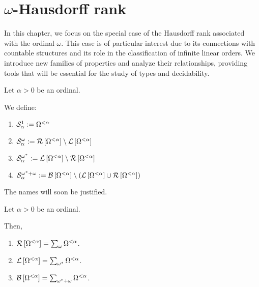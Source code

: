 \section{\texorpdfstring{$\omega$}{omega}-Hausdorff rank}

In this chapter, we focus on the special case of the Hausdorff rank associated with the ordinal $\omega$. This case is of particular interest due to its connections with countable structures and its role in the classification of infinite linear orders. We introduce new families of properties and analyze their relationships, providing tools that will be essential for the study of types and decidability.

\begin{definitions}
  Let $\alpha > 0$ be an ordinal.

  We define:
  \begin{enumerate}
    \item $\mathcal{S}^{1}_{\alpha} := \Omega^{< \alpha}$
    \item $\mathcal{S}^{\omega}_{\alpha} := \mathcal{R} \left[ {{\Omega^{< \alpha}}} \right] \setminus \mathcal{L} \left[ {{\Omega^{< \alpha}}} \right]$
    \item $\mathcal{S}^{\omega^\ast}_{\alpha} := \mathcal{L} \left[ {{\Omega^{< \alpha}}} \right] \setminus \mathcal{R} \left[ {{\Omega^{< \alpha}}} \right]$
    \item $\mathcal{S}^{\omega^\ast + \omega}_{\alpha} := \mathcal{B} \left[ {{\Omega^{< \alpha}}} \right] \setminus \left( { \mathcal{L} \left[ {{\Omega^{< \alpha}}} \right] \cup \mathcal{R} \left[ {{\Omega^{< \alpha}}} \right] } \right)$
  \end{enumerate}

  The names will soon be justified.
\end{definitions}

\begin{lemma}\label{bounded-structure}
  Let $\alpha > 0$ be an ordinal.

  Then,
  \begin{enumerate}
    \item $\mathcal{R} \left[ {{\Omega^{< \alpha}}} \right] = \sum_{\omega}{\Omega^{< \alpha}}$.
    \item $\mathcal{L} \left[ {{\Omega^{< \alpha}}} \right] = \sum_{\omega^\ast}{\Omega^{< \alpha}}$.
    \item $\mathcal{B} \left[ {{\Omega^{< \alpha}}} \right] = \sum_{\omega^\ast + \omega}{\Omega^{< \alpha}}$.
  \end{enumerate}
\end{lemma}

